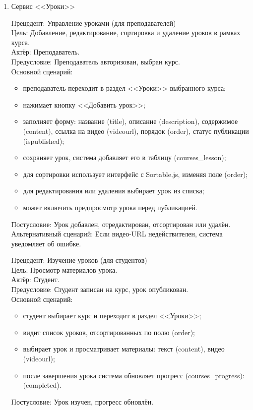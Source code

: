 \begin{enumerate}
	\item {Сервис <<Уроки>>}
	
	{Прецедент: Управление уроками (для преподавателей)} \\
	{Цель}: Добавление, редактирование, сортировка и удаление уроков в рамках курса. \\
	{Актёр}: Преподаватель. \\
	{Предусловие}: Преподаватель авторизован, выбран курс. \\
	{Основной сценарий}:
	\begin{itemize}
		\item преподаватель переходит в раздел <<Уроки>> выбранного курса;
		\item нажимает кнопку <<Добавить урок>>;
		\item заполняет форму: название (title), описание (description), содержимое (content), ссылка на видео (videourl), порядок (order), статус публикации (ispublished);
		\item сохраняет урок, система добавляет его в таблицу (courses\_lesson);
		\item для сортировки использует интерфейс с Sortable.js, изменяя поле (order);
		\item для редактирования или удаления выбирает урок из списка;
		\item может включить предпросмотр урока перед публикацией.
	\end{itemize}
	{Постусловие}: Урок добавлен, отредактирован, отсортирован или удалён. \\
	{Альтернативный сценарий}: Если видео-URL недействителен, система уведомляет об ошибке.
	
	{Прецедент: Изучение уроков (для студентов)} \\
	{Цель}: Просмотр материалов урока. \\
	{Актёр}: Студент. \\
	{Предусловие}: Студент записан на курс, урок опубликован. \\
	{Основной сценарий}:
	\begin{itemize}
		\item студент выбирает курс и переходит в раздел <<Уроки>>;
		\item видит список уроков, отсортированных по полю (order);
		\item выбирает урок и просматривает материалы: текст (content), видео (videourl);
		\item после завершения урока система обновляет прогресс (courses\_progress): (completed).
	\end{itemize}
	{Постусловие}: Урок изучен, прогресс обновлён.
	

\end{enumerate}
